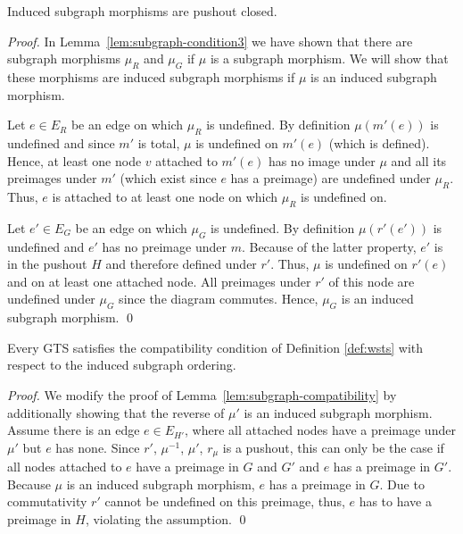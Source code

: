 \documentclass{llncs}
\begin{document}
{\begin{lemma}\label{lem:indsubgraph-condition3}
Induced subgraph morphisms are pushout closed.
\end{lemma}

\begin{proof}
In Lemma~\ref{lem:subgraph-condition3} we have shown that there are subgraph 
morphisms $\mu_R$ and $\mu_G$ if $\mu$ is a subgraph morphism. We will show 
that these morphisms are induced subgraph morphisms if $\mu$ is an induced 
subgraph morphism.

Let $e \in E_R$ be an edge on which $\mu_R$ is undefined. By definition 
$\mu(m'(e))$ is undefined and since $m'$ is total, $\mu$ is 
undefined on $m'(e)$ (which is defined). Hence, at least one node $v$ 
attached to $m'(e)$ has no image under $\mu$ and all its preimages under 
$m'$ (which exist since $e$ has a preimage) are undefined under $\mu_R$. 
Thus, $e$ is attached to at least one node on which $\mu_R$ is undefined on.

Let $e' \in E_G$ be an edge on which $\mu_G$ is undefined. By definition 
$\mu(r'(e'))$ is undefined and $e'$ has no preimage under $m$. 
Because of the latter property, $e'$ is in the pushout $H$ and therefore 
defined under $r'$. Thus, $\mu$ is undefined on $r'(e)$ and on at 
least one attached node. All preimages under $r'$ of this node are 
undefined under $\mu_G$ since the diagram commutes. Hence, $\mu_G$ is an 
induced subgraph morphism. \qed
\end{proof}

\begin{lemma}\label{lem:induced-subgraphs-compatibility}
Every GTS satisfies the compatibility condition of 
Definition \ref{def:wsts} with respect to the induced subgraph ordering.
\end{lemma}

\begin{proof}
We modify the proof of Lemma~\ref{lem:subgraph-compatibility} by additionally 
showing that the reverse of $\mu'$ is an induced subgraph morphism.
Assume there is an edge $e \in E_{H'}$, where all attached nodes have a 
preimage under $\mu'$ but $e$ has none. Since $r'$, $\mu^{-1}$, $\mu'$, 
$r_\mu$ is a pushout, this can only be the case if all nodes attached to $e$ 
have a preimage in $G$ and $G'$ and $e$ has a preimage in $G'$. Because $\mu$ 
is an induced subgraph morphism, $e$ has a preimage in $G$. Due to 
commutativity $r'$ cannot be undefined on this preimage, thus, $e$ has to have 
a preimage in $H$, violating the assumption. \qed
\end{proof}

}
\end{document}
